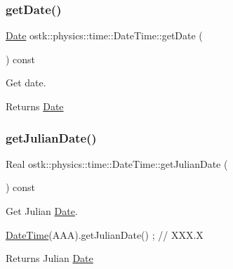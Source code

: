 \subsubsection{\texorpdfstring{get\+Date()}{getDate()}}
{\footnotesize\ttfamily \hyperlink{classostk_1_1physics_1_1time_1_1_date}{Date} ostk\+::physics\+::time\+::\+Date\+Time\+::get\+Date (\begin{DoxyParamCaption}{ }\end{DoxyParamCaption}) const}



Get date. 

\begin{DoxyReturn}{Returns}
\hyperlink{classostk_1_1physics_1_1time_1_1_date}{Date} 
\end{DoxyReturn}
\mbox{\label{classostk_1_1physics_1_1time_1_1_date_time_a067835c455394e18072d654455ac89cb}} 
\subsubsection{\texorpdfstring{get\+Julian\+Date()}{getJulianDate()}}
{\footnotesize\ttfamily Real ostk\+::physics\+::time\+::\+Date\+Time\+::get\+Julian\+Date (\begin{DoxyParamCaption}{ }\end{DoxyParamCaption}) const}



Get Julian \hyperlink{classostk_1_1physics_1_1time_1_1_date}{Date}. 


\begin{DoxyCode}
\hyperlink{classostk_1_1physics_1_1time_1_1_date_time_a974b5a7581ae7461ccf0e6ab85e42633}{DateTime}(AAA).getJulianDate() ; \textcolor{comment}{// XXX.X}
\end{DoxyCode}


\begin{DoxyReturn}{Returns}
Julian \hyperlink{classostk_1_1physics_1_1time_1_1_date}{Date} 
\end{DoxyReturn}
\mbox{\label{classostk_1_1physics_1_1time_1_1_date_time_a8f2ca8f9d2a8e1828c8f92827e1803ca}} 
